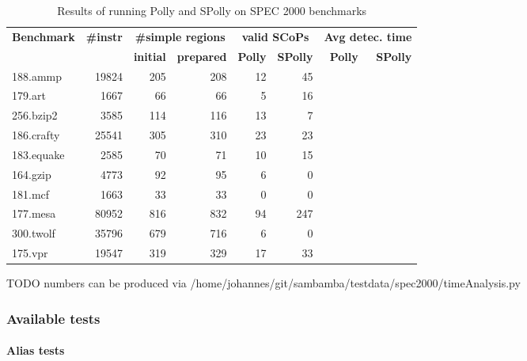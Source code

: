 \begin{table}[htbp]
  \caption{Results of running Polly and SPolly on SPEC 2000 benchmarks}
  \begin{tabular}{| l | r | r | r | r | r | r | r |}
    \hline
    \multirow{2}{*}{\textbf{Benchmark}} & \multirow{2}{*}{\textbf{\#instr}} & \multicolumn{2}{c|}{\textbf{\#simple regions}} &  \multicolumn{2}{c|}{\textbf{valid SCoPs}} &  \multicolumn{2}{c|}{\textbf{Avg detec. time}} \\
    \cline{3-8} 
    & & \textbf{initial} & \textbf{prepared} & \textbf{Polly} & \textbf{SPolly} & \textbf{Polly} & \textbf{SPolly} \\
    \hline
    \hline
    188.ammp   & 19824  & 205 & 208 & 12 & 45 & &  \\
    179.art    &  1667  & 66  &  66 &  5 & 16 & &  \\
    256.bzip2  &  3585  & 114 & 116 & 13 &  7 & &  \\
    186.crafty & 25541  & 305 & 310 & 23 & 23 & &  \\
    183.equake &  2585  &  70 &  71 & 10 & 15 & &  \\
    164.gzip   &  4773  &  92 &  95 &  6 &  0 & &  \\
    181.mcf    &  1663 &  33 &  33  &  0 &  0 & &  \\
    177.mesa   & 80952 & 816 & 832  & 94 &247 & &  \\
    300.twolf  & 35796 & 679 & 716  &  6 &  0 & &  \\
    175.vpr    & 19547 & 319 & 329  & 17 & 33 & &  \\
    \hline
  \end{tabular}
\end{table}
TODO numbers can be produced via /home/johannes/git/sambamba/testdata/spec2000/timeAnalysis.py

\subsubsection{Available tests}

\paragraph{Alias tests}


